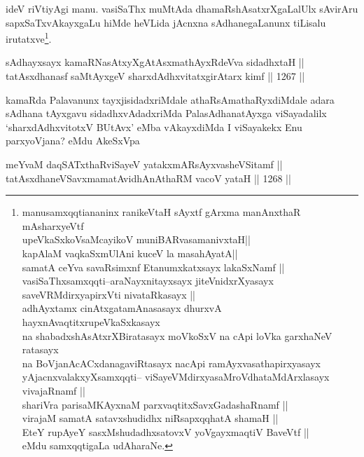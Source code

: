 \begin{artha}
ideV riVtiyAgi manu. vasiSaThx muMtAda dhamaRshAsatxrXgaLalUlx sAvirAru sapxSaTxvAkayxgaLu hiMde heVLida jAcnxna sAdhanegaLanunx tiLisalu irutatxve\footnote{manusamxqqtiananinx ranikeVtaH sAyxtf gArxma manAnxthaR mAsharxyeVtf\\
upeVkaSxkoV\s saMcayikoV muniBARvasamanivxtaH||\\
kapAlaM vaqkaSxmUlAni kuceV la masahAyatA||\\
samatA ceYva savaRsimxnf Etanumxkatxsayx lakaSxNamf ||\\ vasiSaThxsamxqqti--araNayxnitayxsayx jiteVnidxrXyasayx saveVRMdirxyapirxVti nivataRkasayx ||\\
adhAyxtamx cinAtxgatamAnasasayx dhurxvA hayxnAvaqtitxrupeVkaSxkasayx \\
na shabadxshAsAtxrXBiratasayx moVkoSxV na cApi loVka garxhaNeV ratasayx\\
na BoVjanAcACxdanagaviRtasayx nacApi ramAyxvasathapirxyasayx \\ yAjacnxvalakxyXsamxqqti-- viSayeVMdirxyasaMroVdhataMdArxlasayx vivajaRnamf ||\\
shariVra parisaMKAyxnaM parxvaqtitxSavxGadashaRnamf ||\\
virajaM samatA satavxshudidhx niRsapxqqhatA shamaH ||\\
EteY rupAyeY sasxMshudadhxsatovxV yoVgayxmaqtiV BaveVtf ||\\ eMdu samxqqtigaLa udAharaNe.}.
\end{artha}


\begin{shl}
sAdhayxsayx kamaRNasAtxyXgAtAsxmathAyxRdeVva sidadhxtaH || \\
tatAsxdhanasf saMtAyxgeV sharxdAdhxvitatxgirA\s tarx kimf \hfill || 1267 || 
\end{shl}

\begin{artha}
kamaRda Palavanunx tayxjisidadxriMdale athaRsAmathaRyxdiMdale adara sAdhana tAyxgavu sidadhxvAdadxriMda PalasAdhanatAyxga viSayadalilx `sharxdAdhxvitotxV BUtAvx' eMba vAkayxdiMda I viSayakekx Enu parxyoVjana? eMdu AkeSxVpa
\end{artha}

\begin{shl}
meYvaM daqSATxthaRviSayeV yatakxmARsAyxvasheVSitamf || \\
tatAsxdhaneVSavxmamatAvidhAnAthaRM vacoV yataH \hfill || 1268 ||  
\end{shl}

